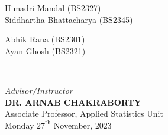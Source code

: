 \begin{titlepage}
\begin{minipage}{0.4\textwidth}
\begin{flushleft} 
Himadri Mandal (BS2327)\\
Siddhartha Bhattacharya (BS2345)
\end{flushleft}
\end{minipage}
\begin{minipage}{0.4\textwidth}
\begin{flushright} 
Abhik Rana (BS2301)\\
Ayan Ghosh (BS2321)
\end{flushright}
\end{minipage}\\[2cm]
\makeatother

\textit{\large Advisor/Instructor}\\
\Large \textbf{DR. ARNAB CHAKRABORTY} \\
Associate Professor, Applied Statistics Unit\\[2cm]


{\large Monday $\text{27}^{\text{th}}$ November, 2023}\\[2cm]
\vfill

\end{titlepage}